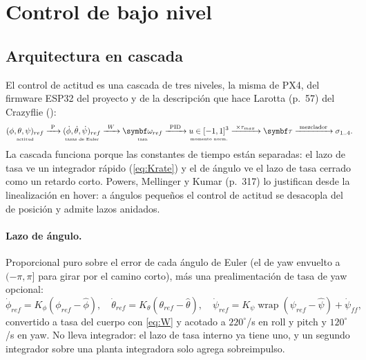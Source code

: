 \section{Control de bajo nivel}
\label{sec:control}

\subsection{Arquitectura en cascada}

El control de actitud es una cascada de tres niveles, la misma de PX4, del
firmware ESP32 del proyecto y de la descripción que hace Larotta
\cite{larotta24} (p.~57) del Crazyflie ():
\begin{equation}
\underset{\scriptscriptstyle \text{actitud}}{(\phi,\theta,\psi)_{ref}}
\xrightarrow{\ \text{P}\ }
\underset{\scriptscriptstyle \text{tasas de Euler}}{(\dot\phi,\dot\theta,\dot\psi)_{ref}}
\xrightarrow{\ W\ }
\underset{\scriptscriptstyle \text{tasa}}{\vect\omega_{ref}}
\xrightarrow{\ \text{PID}\ }
\underset{\scriptscriptstyle \text{momento norm.}}{u\in[-1,1]^3}
\xrightarrow{\ \times\tau_{max}\ }
\vect\tau
\xrightarrow{\ \text{mezclador}\ }\sigma_{1..4}.
\label{eq:cascada}
\end{equation}
La cascada funciona porque las constantes de tiempo están separadas: el lazo
de tasa ve un integrador rápido (\cref{eq:Krate}) y el de ángulo ve el lazo de
tasa cerrado como un retardo corto. Powers, Mellinger y Kumar \cite{hb16}
(p.~317) lo justifican desde la linealización en hover: a ángulos pequeños
el control de actitud se desacopla del de posición y admite lazos anidados.

\paragraph{Lazo de ángulo.} Proporcional puro sobre el error de cada ángulo
de Euler (el de yaw envuelto a $(-\pi,\pi]$ para girar por el camino corto),
más una prealimentación de tasa de yaw opcional:
\begin{equation}
\dot\phi_{ref}=K_{\phi}(\phi_{ref}-\hat\phi),\quad
\dot\theta_{ref}=K_{\theta}(\theta_{ref}-\hat\theta),\quad
\dot\psi_{ref}=K_{\psi}\operatorname{wrap}(\psi_{ref}-\hat\psi)+\dot\psi_{ff},
\end{equation}
convertido a tasa del cuerpo con \eqref{eq:W} y acotado a $220^\circ$/s en
roll y pitch y $120^\circ$/s en yaw. No lleva integrador: el lazo de tasa
interno ya tiene uno, y un segundo integrador sobre una planta integradora
solo agrega sobreimpulso.

